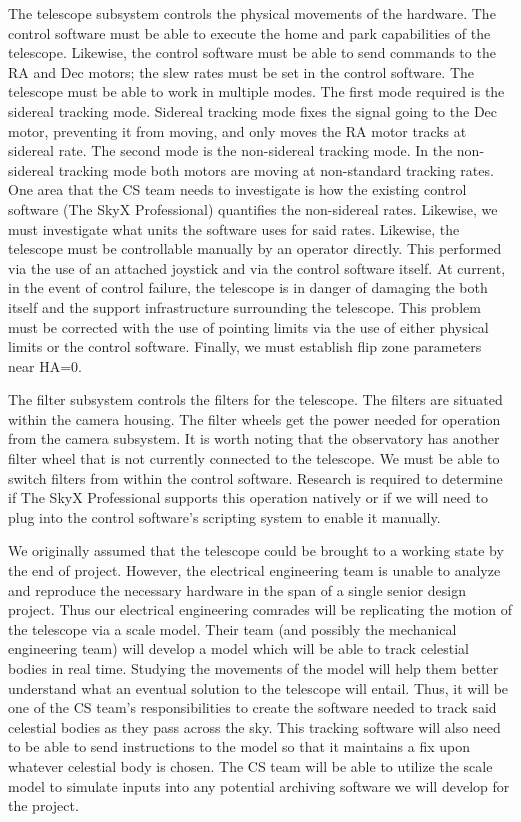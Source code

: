 \documentclass[12pt]{article}
\begin{document}
The telescope subsystem controls the physical movements of the hardware. The control software must be able to execute the home and park capabilities of the telescope. Likewise, the control software must be able to send commands to the RA and Dec motors; the slew rates must be set in the control software. The telescope must be able to work in multiple modes. The first mode required is the sidereal tracking mode. Sidereal tracking mode fixes the signal going to the Dec motor, preventing it from moving, and only moves the RA motor tracks at sidereal rate. The second mode is the non-sidereal tracking mode. In the non-sidereal tracking mode both motors are moving at non-standard tracking rates. One area that the CS team needs to investigate is how the existing control software (The SkyX Professional) quantifies the non-sidereal rates. Likewise, we must investigate what units the software uses for said rates. Likewise, the telescope must be controllable manually by an operator directly. This performed via the use of an attached joystick and via the control software itself. At current, in the event of control failure, the telescope is in danger of damaging the both itself and the support infrastructure surrounding the telescope. This problem must be corrected with the use of pointing limits via the use of either physical limits or the control software. Finally, we must establish flip zone parameters near HA=0.

The filter subsystem controls the filters for the telescope. The filters are situated within the camera housing. The filter wheels get the power needed for operation from the camera subsystem. It is worth noting that the observatory has another filter wheel that is not currently connected to the telescope. We must be able to switch filters from within the control software. Research is required to determine if The SkyX Professional supports this operation natively or if we will need to plug into the control software’s scripting system to enable it manually.

We originally assumed that the telescope could be brought to a working state by the end of project. However, the electrical engineering team is unable to analyze and reproduce the necessary hardware in the span of a single senior design project. Thus our electrical engineering comrades will be replicating the motion of the telescope via a scale model. Their team (and possibly the mechanical engineering team) will develop a model which will be able to track celestial bodies in real time. Studying the movements of the model will help them better understand what an eventual solution to the telescope will entail. Thus, it will be one of the CS team’s responsibilities to create the software needed to track said celestial bodies as they pass across the sky. This tracking software will also need to be able to send instructions to the model so that it maintains a fix upon whatever celestial body is chosen. The CS team will be able to utilize the scale model to simulate inputs into any potential archiving software we will develop for the project.
\end{document}

